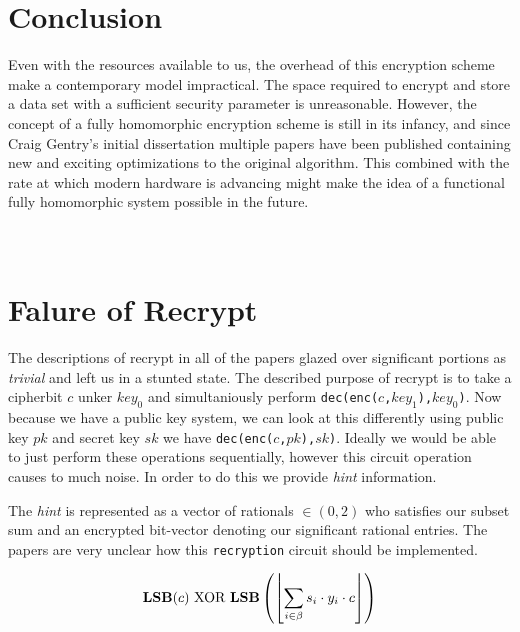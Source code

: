 \documentclass[letterpaper,11pt]{article} %
\begin{document}
\section*{Conclusion}

Even with the resources available to us, the overhead of this encryption scheme make a contemporary model impractical. The space required to encrypt and store a data set with a sufficient security parameter is unreasonable. However, the concept of a fully homomorphic encryption scheme is still in its infancy, and since Craig Gentry's initial dissertation multiple papers have been published containing new and exciting optimizations to the original algorithm. This combined with the rate at which modern hardware is advancing might make the idea of a functional fully homomorphic system possible in the future. \\ \\ \\

\section*{Falure of Recrypt}
The descriptions of recrypt in all of the papers glazed over significant portions as {\em trivial} and left us in a stunted state. The described purpose of recrypt is to take a cipherbit \(c\) unker \(key_0\) and simultaniously perform  {\tt dec(enc(\(c\),\(key_1\)),\(key_0\))}. Now because we have a public key system, we can look at this differently using public key \(pk\) and secret key \(sk\)  we have {\tt dec(enc(\(c\),\(pk\)),\(sk\))}. Ideally we would be able to just perform these operations sequentially, however this circuit operation causes to much noise. In order to do this we provide {\em hint} information. 

The {\em hint } is represented as a vector of rationals \(\in (0,2)\) who satisfies our subset sum and an encrypted bit-vector denoting our significant rational entries. The papers are very unclear how this {\tt recryption} circuit should be implemented. 

\[ \text{{\bf LSB}}(c) \text{  XOR  } \text{{\bf LSB}}\left(\left\lfloor \sum\limits_{i\in\beta}s_i\cdot y_i\cdot c \right\rfloor\right)\]
\end{document}
